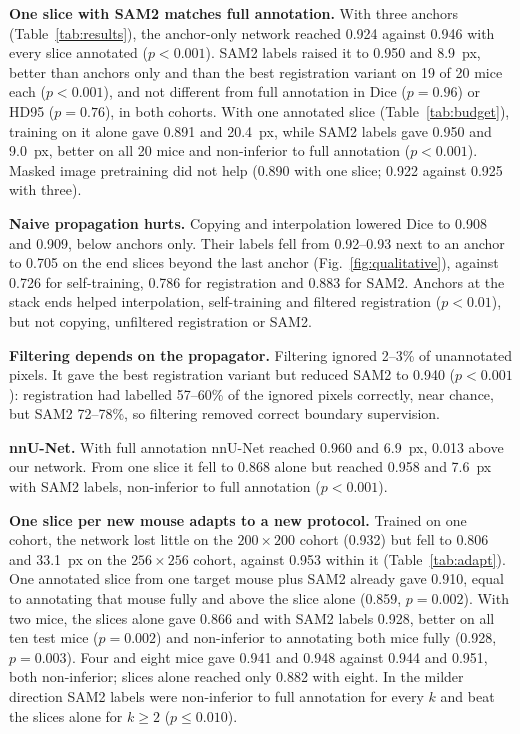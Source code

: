 \textbf{One slice with SAM2 matches full annotation.} With three anchors (Table~\ref{tab:results}), the anchor-only network reached 0.924 against 0.946 with every slice annotated ($p<0.001$). SAM2 labels raised it to 0.950 and 8.9~px, better than anchors only and than the best registration variant on 19 of 20 mice each ($p<0.001$), and not different from full annotation in Dice ($p=0.96$) or HD95 ($p=0.76$), in both cohorts. With one annotated slice (Table~\ref{tab:budget}), training on it alone gave 0.891 and 20.4~px, while SAM2 labels gave 0.950 and 9.0~px, better on all 20 mice and non-inferior to full annotation ($p<0.001$). Masked image pretraining did not help (0.890 with one slice; 0.922 against 0.925 with three).

\textbf{Naive propagation hurts.} Copying and interpolation lowered Dice to 0.908 and 0.909, below anchors only. Their labels fell from 0.92--0.93 next to an anchor to 0.705 on the end slices beyond the last anchor (Fig.~\ref{fig:qualitative}), against 0.726 for self-training, 0.786 for registration and 0.883 for SAM2. Anchors at the stack ends helped interpolation, self-training and filtered registration ($p<0.01$), but not copying, unfiltered registration or SAM2.

\textbf{Filtering depends on the propagator.} Filtering ignored 2--3\% of unannotated pixels. It gave the best registration variant but reduced SAM2 to 0.940 ($p<0.001$): registration had labelled 57--60\% of the ignored pixels correctly, near chance, but SAM2 72--78\%, so filtering removed correct boundary supervision.

\textbf{nnU-Net.} With full annotation nnU-Net reached 0.960 and 6.9~px, 0.013 above our network. From one slice it fell to 0.868 alone but reached 0.958 and 7.6~px with SAM2 labels, non-inferior to full annotation ($p<0.001$).

\textbf{One slice per new mouse adapts to a new protocol.} Trained on one cohort, the network lost little on the $200\times200$ cohort (0.932) but fell to 0.806 and 33.1~px on the $256\times256$ cohort, against 0.953 within it (Table~\ref{tab:adapt}). One annotated slice from one target mouse plus SAM2 already gave 0.910, equal to annotating that mouse fully and above the slice alone (0.859, $p=0.002$). With two mice, the slices alone gave 0.866 and with SAM2 labels 0.928, better on all ten test mice ($p=0.002$) and non-inferior to annotating both mice fully (0.928, $p=0.003$). Four and eight mice gave 0.941 and 0.948 against 0.944 and 0.951, both non-inferior; slices alone reached only 0.882 with eight. In the milder direction SAM2 labels were non-inferior to full annotation for every $k$ and beat the slices alone for $k\ge2$ ($p\le0.010$).

